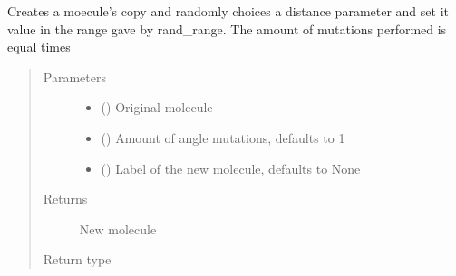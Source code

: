 \documentclass[letterpaper,10pt,english]{sphinxmanual}
\begin{document}

\begin{fulllineitems}
\label{\detokenize{MolOpt.molecular:MolOpt.molecular.molecular.mutate_distances}}
\sphinxAtStartPar
Creates a moecule’s copy and randomly choices a distance parameter and set it value in the range gave by 
rand\_range. The amount of mutations performed is equal times
\begin{quote}\begin{description}
\item[{Parameters}] \leavevmode\begin{itemize}
\item {} 
\sphinxAtStartPar
{} ({\hyperref[\detokenize{MolOpt.molecular:MolOpt.molecular.molecular.Molecule}]{}}) \textendash{} Original molecule

\item {} 
\sphinxAtStartPar
{} (\sphinxstyleliteralemphasis{\sphinxupquote{, }}) \textendash{} Amount of angle mutations, defaults to 1

\item {} 
\sphinxAtStartPar
{} (\sphinxstyleliteralemphasis{\sphinxupquote{, }}) \textendash{} Label of the new molecule, defaults to None

\end{itemize}

\item[{Returns}] \leavevmode
\sphinxAtStartPar
New molecule

\item[{Return type}] \leavevmode
\sphinxAtStartPar
{\hyperref[\detokenize{MolOpt.molecular:MolOpt.molecular.molecular.Molecule}]{}}

\end{description}\end{quote}

\end{fulllineitems}
\end{document}
